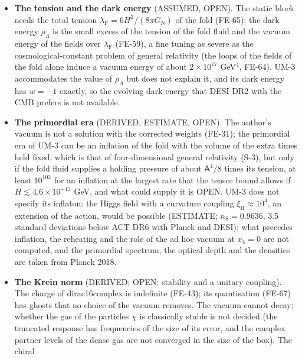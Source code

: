 \documentclass[
  10pt,
]{article}
\begin{document}
\begin{itemize}
  the sizes of compact extra dimensions in other theories) is not part
  of UM-3, and in an early universe that expands faster than \(H\) the
  pressure would have to be enormous (S-3).
\item
  \textbf{The tension and the dark energy} (ASSUMED, OPEN). The static
  block needs the total tension
  \(\lambda_{\mathrm{F}} = 6H^2/(8\pi G_{\mathrm{N}})\) of the fold
  (FE-65); the dark energy \(\rho_\Lambda\) is the small excess of the
  tension of the fold fluid and the vacuum energy of the fields over
  \(\lambda_{\mathrm{F}}\) (FE-59), a fine tuning as severe as the
  cosmological-constant problem of general relativity (the loops of the
  fields of the fold alone induce a vacuum energy of about
  \(2\times10^{77}\) GeV\(^4\), FE-64). UM-3 accommodates the value of
  \(\rho_\Lambda\) but does not explain it, and its dark energy has
  \(w = -1\) exactly, so the evolving dark energy that DESI DR2 with the
  CMB prefers is not available.
\item
  \textbf{The primordial era} (DERIVED, ESTIMATE, OPEN). The author's
  vacuum is not a solution with the corrected weights (FE-31); the
  primordial era of UM-3 can be an inflation of the fold with the volume
  of the extra times held fixed, which is that of four-dimensional
  general relativity (S-3), but only if the fold fluid supplies a
  holding pressure of about \(\mathsf{A}^4/8\) times its tension, at
  least \(10^{103}\) for an inflation at the largest rate that the
  tensor bound allows if \(H \lesssim 4.6\times10^{-13}\) GeV, and what
  could supply it is OPEN. UM-3 does not specify its inflaton: the Higgs
  field with a curvature coupling \(\xi_{\mathrm{H}} \approx 10^4\), an
  extension of the action, would be possible (ESTIMATE;
  \(n_{\mathrm{S}} = 0.9636\), 3.5 standard deviations below ACT DR6
  with Planck and DESI); what precedes inflation, the reheating and the
  role of the ad hoc vacuum at \(x_4 = 0\) are not computed, and the
  primordial spectrum, the optical depth and the densities are taken
  from Planck 2018.
\item
  \textbf{The Krein norm} (DERIVED; OPEN: stability and a unitary
  coupling). The charge of dirac16complex is indefinite (FE-43); its
  quantisation (FE-67) has ghosts that no choice of the vacuum removes.
  The vacuum cannot decay; whether the gas of the particles \(\chi\) is
  classically stable is not decided (the truncated response has
  frequencies of the size of its error, and the complex partner levels
  of the dense gas are not converged in the size of the box). The chiral

\end{itemize}
\end{document}
